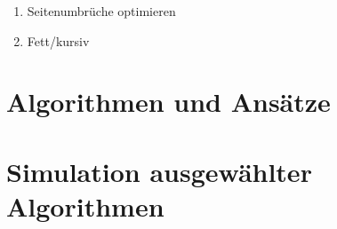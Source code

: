 
\listfiles


\listoftodos

\begin{enumerate}
	\item Seitenumbrüche optimieren
	\item Fett/kursiv
\end{enumerate}



\cleardoublepage

\setcounter{page}{1}
\pagestyle{maincontentstyle}


\part{Algorithmen und Ansätze}






\part{Simulation ausgewählter Algorithmen}







